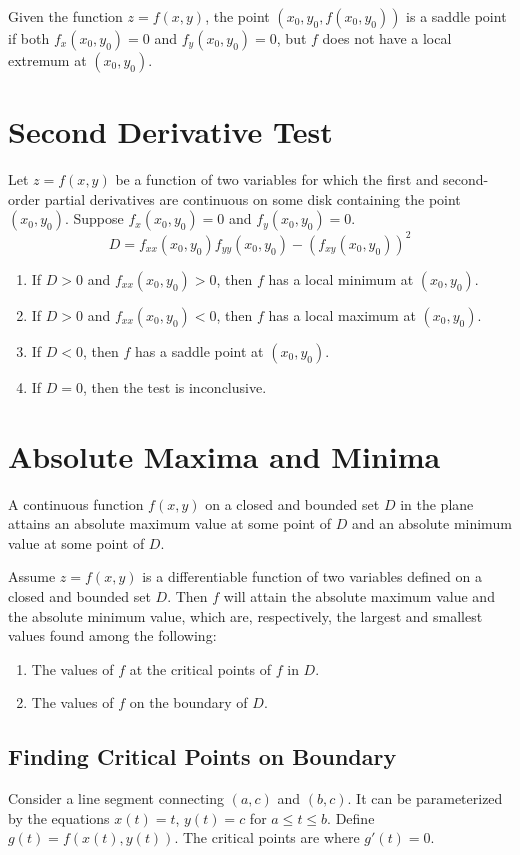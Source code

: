 \documentclass{article}
\begin{document}
Given the function $z=f(x,y)$, the point $(x_0,y_0,f(x_0,y_0))$ is a saddle point if both $f_x(x_0,y_0)=0$ and $f_y(x_0,y_0)=0$, but $f$ does not have a local extremum at $(x_0,y_0)$.

\section*{Second Derivative Test}

Let $z=f(x,y)$ be a function of two variables for which the first and second-order partial derivatives are continuous on some disk containing the point $(x_0,y_0)$. Suppose $f_x(x_0,y_0)=0$ and $f_y(x_0,y_0)=0$.
\[D=f_{xx}(x_0,y_0)f_{yy}(x_0,y_0)-{(f_{xy}(x_0,y_0))}^2\]
\begin{enumerate}
    \item If $D>0$ and $f_{xx}(x_0,y_0)>0$, then $f$ has a local minimum at $(x_0,y_0)$.
    \item If $D>0$ and $f_{xx}(x_0,y_0)<0$, then $f$ has a local maximum at $(x_0,y_0)$.
    \item If $D<0$, then $f$ has a saddle point at $(x_0,y_0)$.
    \item If $D=0$, then the test is inconclusive.
\end{enumerate}

\section*{Absolute Maxima and Minima}

A continuous function $f(x,y)$ on a closed and bounded set $D$ in the plane attains an absolute maximum value at some point of $D$ and an absolute minimum value at some point of $D$.
\vspace{1em}

Assume $z=f(x,y)$ is a differentiable function of two variables defined on a closed and bounded set $D$. Then $f$ will attain the absolute maximum value and the absolute minimum value, which are, respectively, the largest and smallest values found among the following:
\begin{enumerate}
    \item The values of $f$ at the critical points of $f$ in $D$.
    \item The values of $f$ on the boundary of $D$.
\end{enumerate}

\subsection*{Finding Critical Points on Boundary}
Consider a line segment connecting $(a,c)$ and $(b,c)$. It can be parameterized by the equations $x(t)=t$, $y(t)=c$ for $a\leq t\leq b$. Define $g(t)=f(x(t),y(t))$. The critical points are where $g'(t)=0$.
\end{document}
